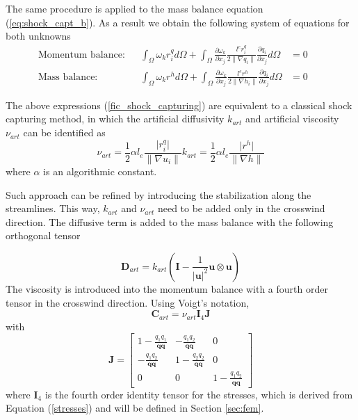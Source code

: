 \documentclass[a4paper,12pt]{elsarticle}
\newcommand{\pder}[2]{\frac{\partial#1}{\partial#2}}
\newcommand{\abs}[1]{\lvert#1\rvert}
\newcommand{\norm}[1]{\lVert#1\rVert}
\begin{document}
The same procedure is applied to the mass balance equation (\ref{eq:shock_capt_b}). As a result we obtain the following system of equations for both unknowns
\begin{subequations} \label{fic_shock_capturing}
\begin{align}
\text{Momentum balance:} &&
\int_\Omega \omega_k r_i^q d\Omega 
+ \int_\Omega \pder{\omega_k}{x_j}
\frac{l^e r_i^q}{2\norm{\nabla q_i}}\pder{q_i}{x_j} d\Omega &=0 && \\
\text{Mass balance:} &&
\int_\Omega \omega_k r^h d\Omega 
+ \int_\Omega \pder{\omega_k}{x_j}
    \frac{l^e r^h}{2\norm{\nabla h_i}}\pder{q_i}{x_j} d\Omega &=0
\end{align}
\end{subequations}

The above expressions (\ref{fic_shock_capturing}) are equivalent to a classical shock capturing method, in which the artificial diffusivity $k_{art}$ and artificial viscosity $\nu_{art}$ can be identified as
\begin{subequations} \label{k_art}
\begin{equation}
\nu_{art} = \frac{1}{2}\alpha l_e \frac{\abs{r_i^q}}{\norm{\nabla u_i}}
\end{equation}
\begin{equation}
k_{art} = \frac{1}{2}\alpha l_e \frac{\abs{r^h}}{\norm{\nabla h}}
\end{equation}
\end{subequations}
where $\alpha$ is an algorithmic constant.

Such approach can be refined by introducing the stabilization along the streamlines. This way, $k_{art}$ and $\nu_{art}$ need to be added only in the crosswind direction. The diffusive term is added to the mass balance with the following orthogonal tensor

\begin{equation}
\mathbf{D}_{art} = k_{art}
\left( \mathbf{I} - \frac{1}{\abs{\mathbf{u}}^2} \mathbf{u} \otimes \mathbf{u} \right)
\end{equation}
The viscosity is introduced into the momentum balance with a fourth order tensor in the crosswind direction. Using Voigt's notation,
\begin{equation}
\mathbf{C}_{art} = \nu_{art} \mathbf{I}_4 \mathbf{J}
\end{equation}
with
\begin{equation}
\mathbf{J} = \left[\begin{matrix}
    1-\frac{q_1q_1}{\mathbf{q}\mathbf{q}} & -\frac{q_1q_2}{\mathbf{q}\mathbf{q}} & 0 \\
    -\frac{q_1q_2}{\mathbf{q}\mathbf{q}} & 1-\frac{q_2q_2}{\mathbf{q}\mathbf{q}} & 0 \\
    0 & 0 & 1-\frac{q_1q_2}{\mathbf{q}\mathbf{q}}
\end{matrix}\right]
\end{equation}
where $\mathbf{I}_4$ is the fourth order identity tensor for the stresses, which is derived from Equation (\ref{stresses}) and will be defined in Section \ref{sec:fem}.
\end{document}

